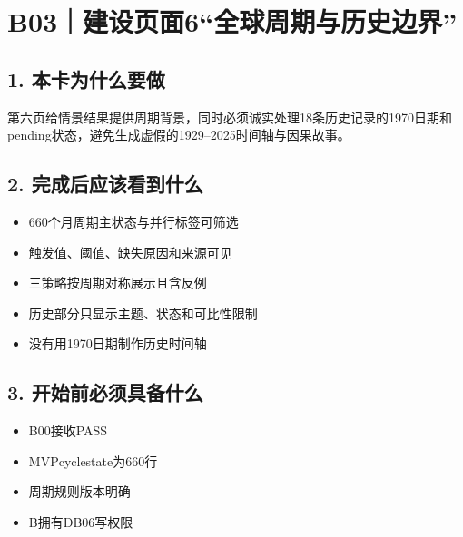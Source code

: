\documentclass[UTF8,openany,zihao=-4]{ctexbook}
\renewcommand{\_}{\textunderscore\allowbreak}
\begin{document}
\clearpage
\section{B03｜建设页面6“全球周期与历史边界”}
\subsection*{1. 本卡为什么要做}
第六页给情景结果提供周期背景，同时必须诚实处理18条历史记录的1970日期和pending状态，避免生成虚假的1929--2025时间轴与因果故事。


\subsection*{2. 完成后应该看到什么}
\begin{itemize}
\item 660个月周期主状态与并行标签可筛选
\item 触发值、阈值、缺失原因和来源可见
\item 三策略按周期对称展示且含反例
\item 历史部分只显示主题、状态和可比性限制
\item 没有用1970日期制作历史时间轴
\end{itemize}

\subsection*{3. 开始前必须具备什么}
\begin{itemize}[label=$\square$]
\item B00接收PASS
\item MVP\_cycle\_state为660行
\item 周期规则版本明确
\item B拥有DB06写权限
\end{itemize}
\end{document}
